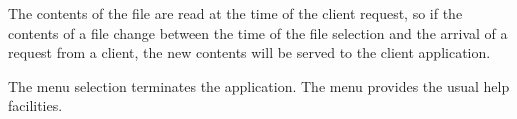 The contents of the file are read at the time of the client request, so
if the contents of a file change between the time of the
 file selection and the arrival of a request from a
client, the new contents will be served to the client application.

The menu selection  terminates the 
 application.  The  menu provides
the usual help facilities.
